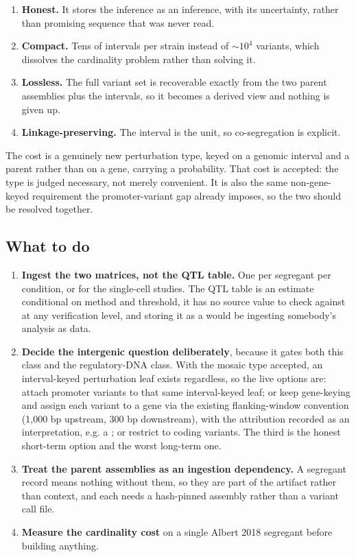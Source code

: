 \begin{enumerate}[leftmargin=1.4em,itemsep=1pt,topsep=2pt]
  \item \textbf{Honest.} It stores the inference as an inference, with its uncertainty,
    rather than promising sequence that was never read.
  \item \textbf{Compact.} Tens of intervals per strain instead of $\sim\!10^4$ variants,
    which dissolves the cardinality problem rather than solving it.
  \item \textbf{Lossless.} The full variant set is recoverable exactly from the two parent
    assemblies plus the intervals, so it becomes a derived view and nothing is given up.
  \item \textbf{Linkage-preserving.} The interval is the unit, so co-segregation is
    explicit.
\end{enumerate}

The cost is a genuinely new perturbation type, keyed on a genomic interval and a parent
rather than on a gene, carrying a probability. That cost is accepted: the type is judged
necessary, not merely convenient. It is also the same non-gene-keyed requirement the
promoter-variant gap already imposes, so the two should be resolved together.

\subsection{What to do}\label{sec:todo}

\begin{enumerate}[leftmargin=1.4em,itemsep=2pt,topsep=2pt]
  \item \textbf{Ingest the two matrices, not the QTL table.} One
     per segregant per condition, or
     for the single-cell studies. The QTL table is an
    estimate conditional on method and threshold, it has no source value to check against
    at any verification level, and storing it as a  would be ingesting
    somebody's analysis as data.
  \item \textbf{Decide the intergenic question deliberately}, because it gates both this
    class and the regulatory-DNA class. With the mosaic type accepted, an interval-keyed
    perturbation leaf exists regardless, so the live options are: attach promoter
    variants to that same interval-keyed leaf; or keep gene-keying and assign each
    variant to a gene via the existing flanking-window convention (1,000 bp upstream,
    300 bp downstream), with the attribution recorded as an interpretation, e.g. a
    ; or restrict to coding variants. The third is the honest
    short-term option and the worst long-term one.
  \item \textbf{Treat the parent assemblies as an ingestion dependency.} A segregant record
    means nothing without them, so they are part of the artifact rather than context, and
    each needs a hash-pinned assembly rather than a variant call file.
  \item \textbf{Measure the cardinality cost} on a single Albert 2018 segregant before
    building anything.
\end{enumerate}

